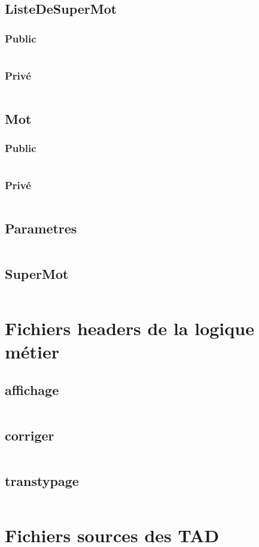\documentclass[12pt,titlepage,a4paper]{report}
\newcommand{\inputCodeH}[1]{\inputminted[tabsize=4,linenos]{c}{../programme/include/#1.h}}
\begin{document}
\section{ListeDeSuperMot}					
	\subsection{Public}					\inputCodeH{TADListeDeSuperMot}
	\subsection{Privé}					\inputCodeH{TADListeDeSuperMotPrive}
\section{Mot}
	\subsection{Public}					\inputCodeH{TADMot}
	\subsection{Privé}					\inputCodeH{TADMotPrive}
\section{Parametres}					\inputCodeH{TADParametres}
\section{SuperMot}						\inputCodeH{TADSuperMot}

\chapter{Fichiers headers de la logique métier}
\minitoc
	\section{affichage}						\inputCodeH{affichage}
	\section{corriger}						\inputCodeH{corriger}
	\section{transtypage}					\inputCodeH{transtypage}

\chapter{Fichiers sources des TAD}
\minitoc
\end{document}
